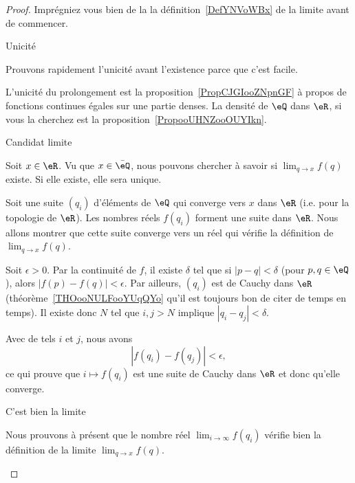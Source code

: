 \begin{proof}
    Imprégniez vous bien de la la définition~\ref{DefYNVoWBx} de la limite avant de commencer.

    \begin{subproof}

    \item[Unicité]

        Prouvons rapidement l'unicité avant l'existence parce que c'est facile.

        L'unicité du prolongement est la proposition~\ref{PropCJGIooZNpnGF} à propos de fonctions continues égales sur une partie denses. La densité de \( \eQ\) dans \( \eR\), si vous la cherchez est la proposition~\ref{PropooUHNZooOUYIkn}.

        \item[Candidat limite]

        Soit \( x\in \eR\). Vu que \( x\in \bar \eQ\), nous pouvons chercher à savoir si \( \lim_{q\to x} f(q) \) existe. Si elle existe, elle sera unique.

        Soit une suite \( (q_i)\) d'éléments de \( \eQ\) qui converge vers \( x\) dans \( \eR\) (i.e. pour la topologie de \( \eR\)). Les nombres réels \( f(q_i)\) forment une suite dans \( \eR\). Nous allons montrer que cette suite converge vers un réel qui vérifie la définition de \( \lim_{q\to x}f(q)\).

        Soit \( \epsilon>0\). Par la continuité de \( f\), il existe \( \delta\) tel que si \( | p-q |<\delta\) (pour \( p,q\in \eQ\)), alors \( | f(p)-f(q) |<\epsilon\). Par ailleurs, \( (q_i)\) est de Cauchy dans \( \eR\) (théorème~\ref{THOooNULFooYUqQYo} qu'il est toujours bon de citer de temps en temps). Il existe donc \( N\) tel que \( i,j>N\) implique \( | q_i-q_j |<\delta\).

        Avec de tels \( i\) et \( j\), nous avons
        \begin{equation}
            | f(q_i)-f(q_j) |<\epsilon,
        \end{equation}
        ce qui prouve que \( i\mapsto f(q_i)\) est une suite de Cauchy dans \( \eR\) et donc qu'elle converge.

    \item[C'est bien la limite]

        Nous prouvons à présent que le nombre réel \( \lim_{i\to \infty} f(q_i)\) vérifie bien la définition de la limite \( \lim_{q\to x}f(q)\).


\end{subproof}
\end{proof}
